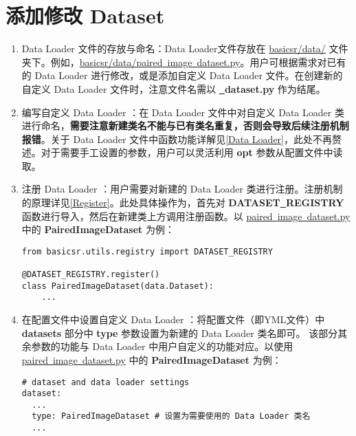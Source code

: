 \documentclass[../main.tex]{subfiles}
\begin{document}
\section{添加修改 Dataset}\label{howto:add_dataset}
\begin{enumerate}
    \item Data Loader 文件的存放与命名：Data Loader文件存放在 \href{https://github.com/XPixelGroup/BasicSR/tree/master/basicsr/data}{basicsr/data/} 文件夹下。例如，\href{https://github.com/XPixelGroup/BasicSR/tree/master/basicsr/data}{basicsr/data/paired\underline{~}image\underline{~}dataset.py}。用户可根据需求对已有的 Data Loader 进行修改，或是添加自定义 Data Loader 文件。在创建新的自定义 Data Loader 文件时，注意文件名需以  \textbf{\underline{~}dataset.py} 作为结尾。

    \item 编写自定义 Data Loader ：在 Data Loader 文件中对自定义 Data Loader 类进行命名，\textbf{需要注意新建类名不能与已有类名重复，否则会导致后续注册机制报错}。关于 Data Loader 文件中函数功能详解见\ref{Data Loader}，此处不再赘述。对于需要手工设置的参数，用户可以灵活利用 \textbf{opt} 参数从配置文件中读取。

    \item 注册 Data Loader ：用户需要对新建的 Data Loader 类进行注册。注册机制的原理详见\ref{Register}。此处具体操作为，首先对 \textbf{DATASET\underline{~}REGISTRY} 函数进行导入，然后在新建类上方调用注册函数。以 \href{https://github.com/XPixelGroup/BasicSR/tree/master/basicsr/data/paired_image_dataset.py}{paired\underline{~}image\underline{~}dataset.py} 中的 \textbf{PairedImageDataset} 为例：
          \begin{verbatim}
from basicsr.utils.registry import DATASET_REGISTRY

@DATASET_REGISTRY.register()
class PairedImageDataset(data.Dataset):
    ...
\end{verbatim}

    \item 在配置文件中设置自定义 Data Loader ：将配置文件（即YML文件）中 \textbf{datasets} 部分中 \textbf{type} 参数设置为新建的 Data Loader 类名即可。
          该部分其余参数的功能与 Data Loader 中用户自定义的功能对应。以使用 \href{https://github.com/XPixelGroup/BasicSR/tree/master/basicsr/data/paired_image_dataset.py}{paired\underline{~}image\underline{~}dataset.py} 中的 \textbf{PairedImageDataset} 为例：
          \begin{verbatim}
# dataset and data loader settings
dataset:
  ...
  type: PairedImageDataset # 设置为需要使用的 Data Loader 类名
  ...
\end{verbatim}
\end{enumerate}
\end{document}
